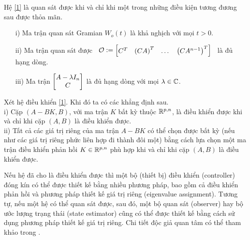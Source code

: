 \begin{dly}\citep[Chương 6]{Che98}
	Hệ \eqref{1} là quan sát được khi và chỉ khi một trong những điều kiện tương đương sau được thỏa mãn.
	\begin{enumerate}
		\item[i)] Ma trận quan sát Gramian $W_o(t)$ là khả nghịch với mọi $t>0$. 
		\item[ii)] Ma trận quan sát được \ $\mathcal{O} := \begin{bmatrix} C^T & \left( CA \right) ^T & \dots & \left( CA^{n-1}\right) ^T  \end{bmatrix}$ \ 
		là đủ hạng dòng.
		\item[iii)] Ma trận $\begin{bmatrix} A-\lambda I_n \\ C \end{bmatrix}$ là đủ hạng dòng với mọi $\lambda \in \mathbb{C}$.
	\end{enumerate}
\end{dly}

\begin{dly}\cite[Chương 8]{Che98} Xét hệ điều khiển \eqref{1}. Khi đó ta có các khẳng định sau. \\
i) Cặp $(A-BK,B)$, với ma trận $K$ bất kỳ thuộc $\mathbb{R}^{p,n}$, là điều khiển được khi và chỉ khi cặp $(A,B)$ là điều khiển được. \\
ii) Tất cả các giá trị riêng của ma trận $A-BK$ có thể chọn được bất kỳ (nếu như các giá trị riêng phức liên hợp đi thành đôi một) bằng cách lựa chọn một ma trận điều khiển phản hồi $K \in \mathbb{R}^{p,n}$ phù hợp khi và chỉ khi cặp $(A,B)$ là điều khiển được.
\end{dly}

Nếu hệ đã cho là điều khiển được thì một bộ (thiết bị) điều khiển (controller) đóng kín có thể được thiết kế bằng nhiều phương pháp, bao gồm cả điều khiển phản hồi và phương pháp thiết kế giá trị riêng (eigenvalue assignment). Tương tự, nếu một hệ có thể quan sát được, sau đó, một bộ quan sát (observer) hay bộ ước lượng trạng thái (state estimator) cũng có thể được thiết kế bằng cách sử dụng phương pháp thiết kế giá trị riêng. Chi tiết độc giả quan tâm có thể tham khảo trong \citep[Chương 8, 9]{Che98}. 





















